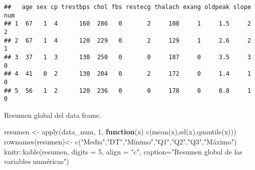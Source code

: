 \documentclass[
]{article}
\newenvironment{Shaded}{\begin{snugshade}}{\end{snugshade}}
\newcommand{\AttributeTok}[1]{\textcolor[rgb]{0.77,0.63,0.00}{#1}}
\newcommand{\ControlFlowTok}[1]{\textcolor[rgb]{0.13,0.29,0.53}{\textbf{#1}}}
\newcommand{\DecValTok}[1]{\textcolor[rgb]{0.00,0.00,0.81}{#1}}
\newcommand{\FunctionTok}[1]{\textcolor[rgb]{0.00,0.00,0.00}{#1}}
\newcommand{\NormalTok}[1]{#1}
\newcommand{\OtherTok}[1]{\textcolor[rgb]{0.56,0.35,0.01}{#1}}
\newcommand{\SpecialCharTok}[1]{\textcolor[rgb]{0.00,0.00,0.00}{#1}}
\newcommand{\StringTok}[1]{\textcolor[rgb]{0.31,0.60,0.02}{#1}}
\begin{document}
\begin{verbatim}
##   age sex cp trestbps chol fbs restecg thalach exang oldpeak slope num
## 1  67   1  4      160  286   0       2     108     1     1.5     2   2
## 2  67   1  4      120  229   0       2     129     1     2.6     2   1
## 3  37   1  3      130  250   0       0     187     0     3.5     3   0
## 4  41   0  2      130  204   0       2     172     0     1.4     1   0
## 5  56   1  2      120  236   0       0     178     0     0.8     1   0
\end{verbatim}

Resumen global del data frame.

\begin{Shaded}
\begin{Highlighting}[]
\NormalTok{resumen }\OtherTok{\textless{}{-}} \FunctionTok{apply}\NormalTok{(data\_num, }\DecValTok{1}\NormalTok{,}
                     \ControlFlowTok{function}\NormalTok{(x) }\FunctionTok{c}\NormalTok{(}\FunctionTok{mean}\NormalTok{(x),}\FunctionTok{sd}\NormalTok{(x),}\FunctionTok{quantile}\NormalTok{(x)))}
\FunctionTok{rownames}\NormalTok{(resumen)}\OtherTok{\textless{}{-}} \FunctionTok{c}\NormalTok{(}\StringTok{"Media"}\NormalTok{,}\StringTok{"DT"}\NormalTok{,}\StringTok{"Mínimo"}\NormalTok{,}\StringTok{"Q1"}\NormalTok{,}\StringTok{"Q2"}\NormalTok{,}\StringTok{"Q3"}\NormalTok{,}\StringTok{"Máximo"}\NormalTok{)}
\NormalTok{knitr}\SpecialCharTok{::}\FunctionTok{kable}\NormalTok{(resumen, }\AttributeTok{digits =} \DecValTok{5}\NormalTok{, }\AttributeTok{align =} \StringTok{"c"}\NormalTok{, }\AttributeTok{caption=}\StringTok{"Resumen global de las variables numéricas"}\NormalTok{)}
\end{Highlighting}
\end{Shaded}
\end{document}
